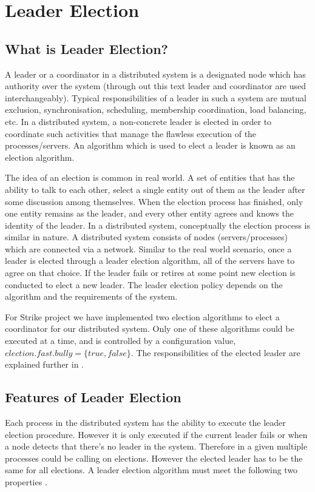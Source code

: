 \documentclass[dareport.tex]{subfiles}
\begin{document}
\section{Leader Election} \label{sec:election}
\subsection{What is Leader Election?}
A leader or a coordinator in a distributed system is a designated node which has authority over the system (through out this text leader and coordinator are used interchangeably). Typical responsibilities of a leader in such a system are mutual exclusion, synchronisation, scheduling, membership coordination, load balancing, etc. In a distributed system, a non-concrete leader is elected in order to coordinate such activities that manage the flawless execution of the processes/servers. An algorithm which is used to elect a leader is known as an election algorithm.

The idea of an election is common in real world. A set of entities that has the ability to talk to each other, select a single entity out of them as the leader after some discussion among themselves. When the election process has finished, only one entity remains as the leader, and every other entity agrees and knows the identity of the leader. In a distributed system, conceptually the election process is similar in nature. A distributed system consists of nodes (servers/processes) which are connected via a network. Similar to the real world scenario, once a leader is elected through a leader election algorithm, all of the servers have to agree on that choice. If the leader fails or retires at some point new election is conducted to elect a new leader. The leader election policy depends on the algorithm and the requirements of the system.

For Strike project we have implemented two election algorithms to elect a coordinator for our distributed system. Only one of these algorithms could be executed at a time, and is controlled by a configuration value, $election.fast.bully=\{true, false\}$. The responsibilities of the elected leader are explained further in .

\subsection{Features of Leader Election}
Each process in the distributed system has the ability to execute the leader election procedure. However it is only executed if the current leader fails or when a node detects that there's no leader in the system. Therefore in a given multiple processes could be calling on elections. However the elected leader has to be the same for all elections. A leader election algorithm must meet the following two properties \cite{coulouris}.
\end{document}

